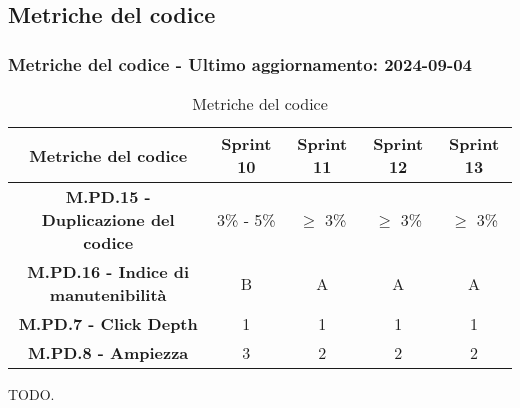 \subsection{Metriche del codice}

\subsubsection*{Metriche del codice - Ultimo aggiornamento: 2024-09-04}

\begin{table}[H]
  \centering
  \begin{tabular}{|c|c|c|c|c|}
      \hline
      Metriche del codice & \textbf{Sprint 10} & \textbf{Sprint 11} & \textbf{Sprint 12}  & \textbf{Sprint 13} \\
      \hline
      \textbf{M.PD.15 - Duplicazione del codice} & 3\% - 5\% & $\ge$ 3\% & $\ge$ 3\% & $\ge$ 3\% \\
      \hline
      \textbf{M.PD.16 - Indice di manutenibilità} & B & A & A & A \\
      \hline
      \textbf{M.PD.7 - Click Depth} & 1 & 1 & 1 & 1 \\
      \hline
      \textbf{M.PD.8 - Ampiezza} & 3 & 2 & 2 & 2 \\
      \hline
  \end{tabular}
  \caption{Metriche del codice}
\end{table}

\par TODO.